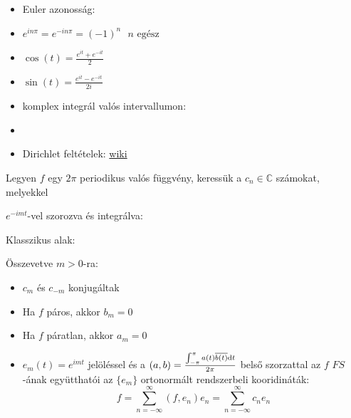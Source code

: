\begin{spacing}{1.3}

\newline
\begin{itemize}
   \item Euler azonosság:

   \item $e^{i n \pi}=e^{-i n \pi}=(-1)^n\ \ \ n\text{ egész}$
   \item $\cos(t)=\frac{e^{it}+e^{-it}}{2}$
   \item $\sin(t)=\frac{e^{it}-e^{-it}}{2i}$
   \item komplex integrál valós intervallumon:
   \item 
\item Dirichlet feltételek: \href{https://en.wikipedia.org/wiki/Dirichlet_conditions}{wiki}\\
\end{itemize}

\vspace{0.5cm}
Legyen $f$ egy $2\pi$ periodikus valós függvény, keressük a 
$c_n\in \mathbb{C}$ számokat, melyekkel

$e^{-imt}$-vel szorozva és integrálva:

Klasszikus alak:

Összevetve $m>0$-ra:

\begin{itemize}
\item $c_{m}$ és $c_{-m}$ konjugáltak
\item Ha $f$ páros, akkor $b_{m}=0$
\item Ha $f$ páratlan, akkor $a_{m}=0$
\item $e_{m}(t)=e^{imt}$ jelöléssel és 
a $(a,b)=\frac{\int_{-\pi}^{\pi} a(t)\overline{b(t)} \text{d}t}{2\pi}$ belső szorzattal az $f$ $FS$-ának  
együtthatói az $\{ e_m \} $ ortonormált rendszerbeli kooridináták:
\begin{equation*}
   f=\sum_{n=-\infty}^{\infty} (f,e_{n})e_{n}=\sum_{n=-\infty}^{\infty} c_{n}e_{n}
\end{equation*}


\end{itemize}
\end{spacing}
